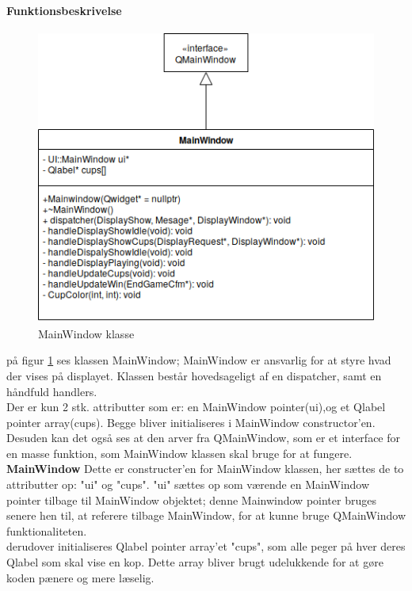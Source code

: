 \documentclass[Softwaredesign/Softwaredesign_main.tex]{subfiles}
\begin{document}
\paragraph{Funktionsbeskrivelse}
\begin{figure}
    \centering
    \includegraphics[scale=0.9]{Softwaredesign/GUI/Pictures/Mainwindow_klasse.png}
    \caption{MainWindow klasse}
    \label{fig:MainWindow_klasse}
\end{figure}

på figur \ref{fig:MainWindow_klasse} ses klassen MainWindow; MainWindow er ansvarlig for at styre hvad der vises på displayet. Klassen består hovedsageligt af en dispatcher, samt en håndfuld handlers.\\ 
Der er kun 2 stk. attributter som er: en MainWindow pointer(ui),og et Qlabel pointer array(cups). Begge bliver initialiseres i MainWindow constructor'en.  
Desuden kan det også ses at den arver fra QMainWindow, som er et interface for en masse funktion, som MainWindow klassen skal bruge for at fungere. \\

\textbf{MainWindow}
Dette er constructer'en for MainWindow klassen, her sættes de to attributter op: "ui" og "cups". "ui" sættes op som værende en MainWindow pointer tilbage til MainWindow objektet; denne Mainwindow pointer bruges senere hen til, at referere tilbage MainWindow, for at kunne bruge QMainWindow funktionaliteten. 
\\
derudover initialiseres Qlabel pointer array'et "cups", som alle peger på hver deres Qlabel som skal vise en kop. Dette array bliver brugt udelukkende for at gøre koden pænere og mere læselig. 
\end{document}
